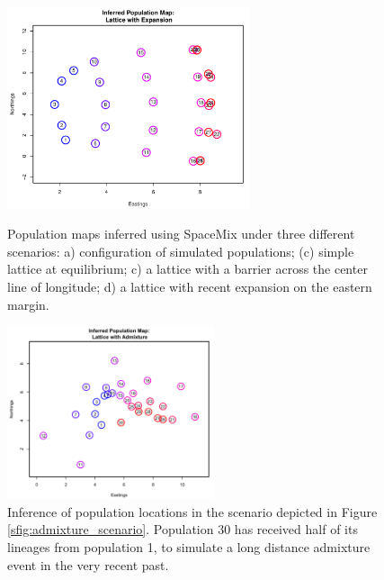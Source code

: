 \documentclass[12pt]{article}
\begin{document}
\begin{figure}
			{\includegraphics[width=2.8in,height=2.33in]{figs/GeoGenMap_expansion.pdf}}
	\caption{Population maps inferred using SpaceMix under three different scenarios: a) configuration of simulated populations; (c) simple lattice at equilibrium; c) a lattice with a barrier across the center line of longitude; d) a lattice with recent expansion on the eastern margin.}\label{sfig:lattice_scenarios}
\end{figure}


\begin{figure}
	\centering
	\includegraphics[width=2.4in,height=2in]{figs/GeoGenMap_corner_admixture_CYOL.png}
	\caption{Inference of population locations in the scenario depicted in Figure \ref{sfig:admixture_scenario}.  Population 30 has received half of its lineages from population 1, to simulate a long distance admixture event in the very recent past.}\label{sfig:admixture_inference_CYOL}
\end{figure}
\end{document}
